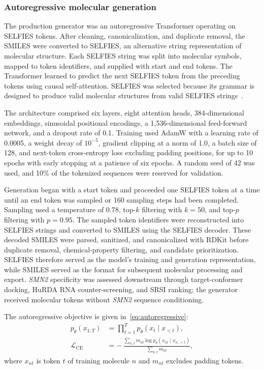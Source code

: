 \documentclass[journal]{IEEEtran}
\begin{document}
\subsubsection{Autoregressive molecular generation}
The production generator was an autoregressive Transformer operating on
SELFIES tokens. After cleaning, canonicalization, and duplicate removal,
the SMILES were converted to SELFIES, an alternative string
representation of molecular structure. Each SELFIES string was split
into molecular symbols, mapped to token identifiers, and supplied with
start and end tokens. The Transformer learned to predict the next
SELFIES token from the preceding tokens using causal self-attention.
SELFIES was selected because its grammar is designed to produce valid
molecular structures from valid SELFIES strings~\cite{krenn2020}.

The architecture comprised six layers, eight attention heads,
384-dimensional embeddings, sinusoidal positional encodings, a
1{,}536-dimensional feed-forward network, and a dropout rate of 0.1.
Training used AdamW with a learning rate of 0.0005, a weight decay of
$10^{-5}$, gradient clipping at a norm of 1.0, a batch size of 128, and
next-token cross-entropy loss excluding padding positions, for up to 10
epochs with early stopping at a patience of six epochs. A random seed of
42 was used, and 10\% of the tokenized sequences were reserved for
validation.

Generation began with a start token and proceeded one SELFIES token at a
time until an end token was sampled or 160 sampling steps had been
completed. Sampling used a temperature of 0.78, top-$k$ filtering with
$k = 50$, and top-$p$ filtering with $p = 0.95$. The sampled token
identifiers were reconstructed into SELFIES strings and converted to
SMILES using the SELFIES decoder. These decoded SMILES were parsed,
sanitized, and canonicalized with RDKit before duplicate removal,
chemical-property filtering, and candidate prioritization. SELFIES
therefore served as the model's training and generation representation,
while SMILES served as the format for subsequent molecular processing
and export. \textit{SMN2} specificity was assessed downstream through
target-conformer docking, HuRDA RNA counter-screening, and SRSI ranking;
the generator received molecular tokens without \textit{SMN2} sequence
conditioning.

The autoregressive objective is given in~\eqref{eq:autoregressive}:
\begin{equation}
\begin{aligned}
p_{\theta}(x_{1:T}) &= \prod_{t=1}^{T} p_{\theta}(x_{t} \mid x_{<t}),\\[4pt]
\mathscr{L}_{\mathrm{CE}} &= -\,\frac{\displaystyle\sum_{n,t} m_{nt}
\log p_{\theta}(x_{nt} \mid x_{n,<t})}{\displaystyle\sum_{n,t} m_{nt}},
\end{aligned}
\label{eq:autoregressive}
\end{equation}
where $x_{nt}$ is token $t$ of training molecule $n$ and $m_{nt}$
excludes padding tokens.
\end{document}
